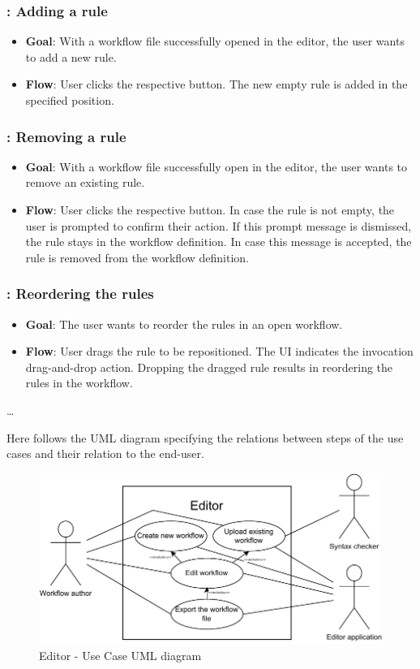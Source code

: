\subsubsection*{\usecase: Adding a rule}
\begin{itemize}
    \item \textbf{Goal}: With a workflow file successfully opened in the editor, the user wants to add a new rule.
    \item \textbf{Flow}: User clicks the respective button. The new empty rule is added in the specified position.
\end{itemize}

\subsubsection*{\usecase: Removing a rule}
\begin{itemize}
    \item \textbf{Goal}: With a workflow file successfully open in the editor, the user wants to remove an existing rule.
    \item \textbf{Flow}: User clicks the respective button. In case the rule is not empty, the user is prompted to confirm their action.
    If this prompt message is dismissed, the rule stays in the workflow definition. In case this message is accepted, the rule is removed from the workflow definition.
\end{itemize}

\subsubsection*{\usecase: Reordering the rules}
\begin{itemize}
    \item \textbf{Goal}: The user wants to reorder the rules in an open workflow.
    \item \textbf{Flow}: User drags the rule to be repositioned. The \ac{UI} indicates the invocation drag-and-drop action.
    Dropping the dragged rule results in reordering the rules in the workflow.
\end{itemize}

\dots
\emptyline

Here follows the UML diagram specifying the relations between steps of the use cases and their relation to the end-user.

\begin{figure}[h!]
    \includegraphics{./img/editorUC.pdf}
    \caption{Editor - Use Case UML diagram}
\end{figure}

